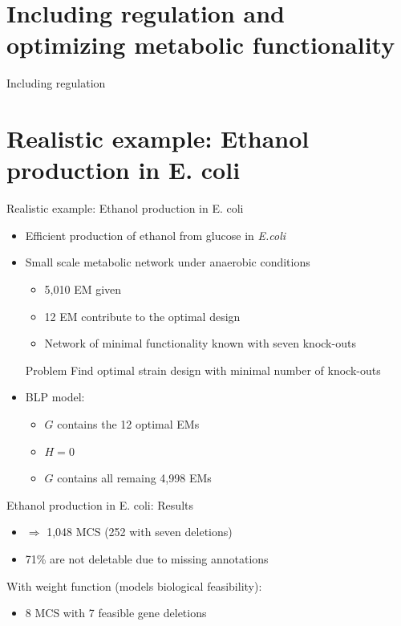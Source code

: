 \documentclass{beamer}
\begin{document}
\section{Including regulation and optimizing metabolic functionality}
\begin{frame}{Including regulation}

\end{frame}


\section{Realistic example: Ethanol production in E. coli}
\begin{frame}{Realistic example: Ethanol production in E. coli}
	\begin{itemize}
		\item Efficient production of ethanol from glucose in \emph{E.coli}
		\item Small scale metabolic network under anaerobic conditions
		\begin{itemize}
			\item 5,010 EM given
			\item 12 EM contribute to the optimal design
			\item Network of minimal functionality known with seven knock-outs
		\end{itemize}
	\begin{block}{Problem}
		 Find optimal strain design with minimal number of knock-outs 
	\end{block}

		\item BLP model:
		\begin{itemize}
			\item $G$ contains the 12 optimal EMs
			\item $H=0$
			\item $G$ contains all remaing 4,998 EMs
		\end{itemize}
	\end{itemize}
\end{frame}

\begin{frame}{Ethanol production in E. coli: Results}
	\begin{itemize}
	\item $\Rightarrow$ 1,048 MCS (252 with seven deletions)
	\item 71\% are not deletable due to missing annotations
	\end{itemize}
With weight function (models biological feasibility):
	\begin{itemize}
		\item 8 MCS with 7 feasible gene deletions		
	\end{itemize}
\end{frame}
\end{document}
